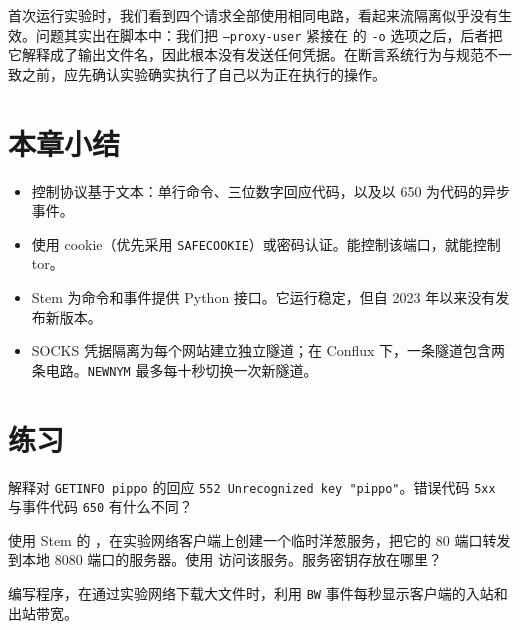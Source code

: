 \begin{attenzione}[实验中犯过的错误]
首次运行实验时，我们看到四个请求全部使用相同电路，看起来流隔离似乎没有生效。问题其实出在脚本中：我们把 \texttt{--proxy-user} 紧接在  的 \texttt{-o} 选项之后，后者把它解释成了输出文件名，因此根本没有发送任何凭据。在断言系统行为与规范不一致之前，应先确认实验确实执行了自己以为正在执行的操作。
\end{attenzione}

\section*{本章小结}
\begin{itemize}
  \item 控制协议基于文本：单行命令、三位数字回应代码，以及以 650 为代码的异步事件。
  \item 使用 cookie（优先采用 \texttt{SAFECOOKIE}）或密码认证。能控制该端口，就能控制 tor。
  \item Stem 为命令和事件提供 Python 接口。它运行稳定，但自 2023 年以来没有发布新版本。
  \item SOCKS 凭据隔离为每个网站建立独立隧道；在 Conflux 下，一条隧道包含两条电路。\texttt{NEWNYM} 最多每十秒切换一次新隧道。
\end{itemize}

\section*{练习}

\begin{esercizio}[1]\label{es:18-codici}
解释对 \texttt{GETINFO pippo} 的回应 \texttt{552 Unrecognized key "pippo"}。错误代码 \texttt{5xx} 与事件代码 \texttt{650} 有什么不同？
\end{esercizio}

\begin{esercizio}[2]\label{es:18-onion}
使用 Stem 的 ，在实验网络客户端上创建一个临时洋葱服务，把它的 80 端口转发到本地 8080 端口的服务器。使用  访问该服务。服务密钥存放在哪里？
\end{esercizio}

\begin{esercizio}[2]\label{es:18-banda}
编写程序，在通过实验网络下载大文件时，利用 \texttt{BW} 事件每秒显示客户端的入站和出站带宽。
\end{esercizio}

